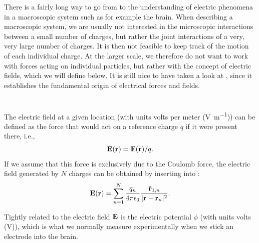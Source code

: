 There is a fairly long way to go from  to the understanding of electric phenomena in a macroscopic system such as for example the brain. When describing a macroscopic system, we are usually not interested in the microscopic interactions between a small number of charges, but rather the joint interactions of a very, very large number of charges. It is then not feasible to keep track of the motion of each individual charge. At the larger scale, we therefore do not want to work with forces acting on individual particles, but rather with the concept of electric fields, which we will define below. It is still nice to have taken a look at , since it establishes the fundamental origin of electrical forces and fields. 


\section{}
\label{sec:Basics:Fields} 

The electric field at a given location (with units volts per meter (\si{\volt\per\metre})) can be defined as the force that would act on a reference charge $q$ if it were present there, i.e., 
\begin{equation}
{\bf E}({\bf r}) = {\bf F}({\bf r})/q.
\label{eq:Basics:E}
\end{equation}
If we assume  that this force is exclusively due to the Coulomb force, the electric field generated by $N$ charges can be obtained by inserting  into :
\begin{equation}
{\bf E}({\bf r}) = \sum_{n=1}^{N}  \frac{q_n}{4\pi \epsilon_0} \frac{\hat{{\bf r}}_{1,n}}{|{\bf r}-{\bf r}_n|^2}.
\label{eq:Basics:CoulombEN}
\end{equation}

Tightly related to the electric field ${\bf E}$ is the electric potential $\phi$ (with units volts (\si{\volt})), which is what we normally measure experimentally when we stick an electrode into the brain.  

